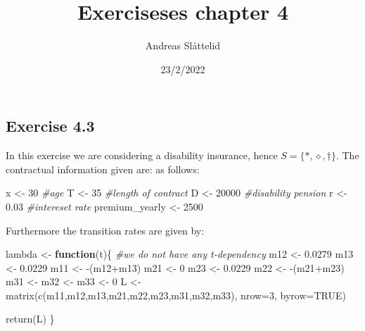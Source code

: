 \documentclass[
]{article}
\title{Exerciseses chapter 4}
\author{Andreas Slåttelid}
\date{23/2/2022}
\newenvironment{Shaded}{\begin{snugshade}}{\end{snugshade}}
\newcommand{\AttributeTok}[1]{\textcolor[rgb]{0.77,0.63,0.00}{#1}}
\newcommand{\CommentTok}[1]{\textcolor[rgb]{0.56,0.35,0.01}{\textit{#1}}}
\newcommand{\ConstantTok}[1]{\textcolor[rgb]{0.00,0.00,0.00}{#1}}
\newcommand{\ControlFlowTok}[1]{\textcolor[rgb]{0.13,0.29,0.53}{\textbf{#1}}}
\newcommand{\DecValTok}[1]{\textcolor[rgb]{0.00,0.00,0.81}{#1}}
\newcommand{\FloatTok}[1]{\textcolor[rgb]{0.00,0.00,0.81}{#1}}
\newcommand{\FunctionTok}[1]{\textcolor[rgb]{0.00,0.00,0.00}{#1}}
\newcommand{\NormalTok}[1]{#1}
\newcommand{\OtherTok}[1]{\textcolor[rgb]{0.56,0.35,0.01}{#1}}
\newcommand{\SpecialCharTok}[1]{\textcolor[rgb]{0.00,0.00,0.00}{#1}}
\begin{document}
\maketitle

\hypertarget{exercise-4.3}{%
\subsection{Exercise 4.3}\label{exercise-4.3}}

In this exercise we are considering a disability insurance, hence
\(S = \{*,\diamond ,\dagger \}\). The contractual information given are:
as follows:

\begin{Shaded}
\begin{Highlighting}[]
\NormalTok{x }\OtherTok{\textless{}{-}} \DecValTok{30}     \CommentTok{\#age}
\NormalTok{T }\OtherTok{\textless{}{-}} \DecValTok{35}     \CommentTok{\#length of contract}
\NormalTok{D }\OtherTok{\textless{}{-}} \DecValTok{20000}  \CommentTok{\#disability pension}
\NormalTok{r }\OtherTok{\textless{}{-}} \FloatTok{0.03}   \CommentTok{\#intereset rate}
\NormalTok{premium\_yearly }\OtherTok{\textless{}{-}} \DecValTok{2500}
\end{Highlighting}
\end{Shaded}

Furthermore the transition rates are given by:

\begin{Shaded}
\begin{Highlighting}[]
\NormalTok{lambda }\OtherTok{\textless{}{-}} \ControlFlowTok{function}\NormalTok{(t)\{}
  \CommentTok{\#we do not have any t{-}dependency}
\NormalTok{  m12 }\OtherTok{\textless{}{-}} \FloatTok{0.0279} 
\NormalTok{  m13 }\OtherTok{\textless{}{-}} \FloatTok{0.0229}
\NormalTok{  m11 }\OtherTok{\textless{}{-}} \SpecialCharTok{{-}}\NormalTok{(m12}\SpecialCharTok{+}\NormalTok{m13)}
\NormalTok{  m21 }\OtherTok{\textless{}{-}} \DecValTok{0}
\NormalTok{  m23 }\OtherTok{\textless{}{-}} \FloatTok{0.0229}
\NormalTok{  m22 }\OtherTok{\textless{}{-}} \SpecialCharTok{{-}}\NormalTok{(m21}\SpecialCharTok{+}\NormalTok{m23)}
\NormalTok{  m31 }\OtherTok{\textless{}{-}}\NormalTok{ m32 }\OtherTok{\textless{}{-}}\NormalTok{ m33 }\OtherTok{\textless{}{-}} \DecValTok{0}
\NormalTok{  L }\OtherTok{\textless{}{-}} \FunctionTok{matrix}\NormalTok{(}\FunctionTok{c}\NormalTok{(m11,m12,m13,m21,m22,m23,m31,m32,m33), }\AttributeTok{nrow=}\DecValTok{3}\NormalTok{, }\AttributeTok{byrow=}\ConstantTok{TRUE}\NormalTok{)}
  
  \FunctionTok{return}\NormalTok{(L)}
\NormalTok{\}}
\end{Highlighting}
\end{Shaded}
\end{document}
